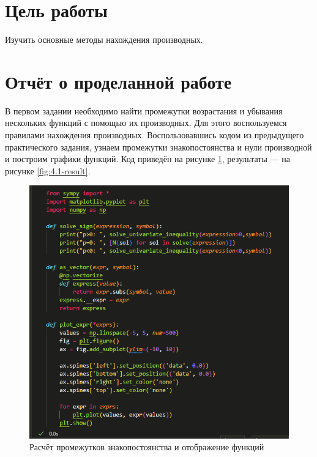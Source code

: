 \documentclass[14pt,a4paper]{extarticle}
\begin{document}


\section*{Цель работы}
        Изучить основные методы нахождения производных.


\section*{Отчёт о проделанной работе}
        В первом задании необходимо найти промежутки возрастания и
убывания нескольких функций с помощью их производных. Для этого воспользуемся
правилами нахождения производных. Воспользовавшись кодом из предыдущего
практического задания, узнаем промежутки знакопостоянства и нули
производной и построим графики функций. Код приведён на рисунке \ref{fig:4.1-code}, результаты
--- на рисунке \ref{fig:4.1-result}.

\begin{figure}[h!]
    \centering
    \includegraphics[width=0.7\linewidth]{figures/1-code.png}
    \caption{Расчёт промежутков знакопостоянства и отображение функций}
    \label{fig:4.1-code}
\end{figure}

\newpage
\end{document}
